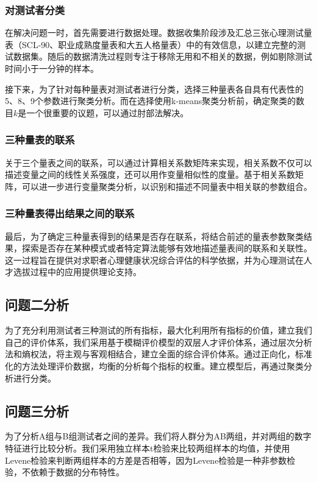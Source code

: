 \documentclass[withoutpreface,bwprint]{cumcmthesis} %
\begin{document}
\subsubsection*{对测试者分类}

在解决问题一时，首先需要进行数据处理。数据收集阶段涉及汇总三张心理测试量表（SCL-90、职业成熟度量表和大五人格量表）中的有效信息，以建立完整的测试数据集。随后的数据清洗过程则专注于移除无用和不相关的数据，例如剔除测试时间小于一分钟的样本。

接下来，为了针对每种量表对测试者进行分类，选择三种量表各自具有代表性的5、8、9个参数进行聚类分析。而在选择使用k-means聚类分析前，确定聚类的数目$k$是一个很重要的议题，可以通过肘部法解决。


\subsubsection*{三种量表的联系}
关于三个量表之间的联系，可以通过计算相关系数矩阵来实现，相关系数不仅可以描述变量之间的线性关系强度，还可以用作变量相似性的度量。基于相关系数矩阵，可以进一步进行变量聚类分析，以识别和描述不同量表中相关联的参数组合。

\subsubsection*{三种量表得出结果之间的联系}

最后，为了确定三种量表得到的结果是否存在联系，将结合前述的量表参数聚类结果，探索是否存在某种模式或者特定算法能够有效地描述量表间的联系和关联性。这一过程旨在提供对求职者心理健康状况综合评估的科学依据，并为心理测试在人才选拔过程中的应用提供理论支持。

\subsection{问题二分析}

为了充分利用测试者三种测试的所有指标，最大化利用所有指标的价值，建立我们自己的评价体系，我们采用基于模糊评价模型的双层人才评价体系，通过层次分析法和熵权法，将主观与客观相结合，建立全面的综合评价体系。通过正向化，标准化的方法处理评价数据，均衡的分析每个指标的权重。建立模型后，再通过聚类分析进行分类。

\subsection{问题三分析}

为了分析A组与B组测试者之间的差异。我们将人群分为AB两组，并对两组的数字特征进行比较分析。我们采用独立样本t检验来比较两组样本的均值，并使用Levene检验来判断两组样本的方差是否相等，因为Levene检验是一种非参数检验，不依赖于数据的分布特性。
\end{document}
